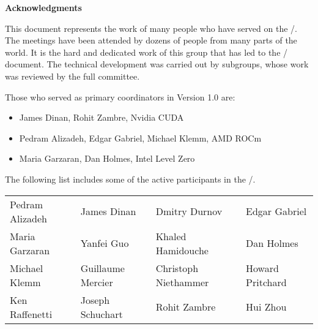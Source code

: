 {\Huge\noindent\textbf{Acknowledgments}}%
{}

\vspace{0.5in}



This document represents the work of many people who have served on
the \MPIHACC/.  The meetings have been attended by dozens of people
from many parts of the world. It is the hard and dedicated work of
this group that has led to the \MEMALLOCDOC/ document. The technical
development was carried out by subgroups, whose work was reviewed by
the full committee.

Those who served as primary coordinators in Version 1.0 are:

\begin{itemize}
\item James Dinan, Rohit Zambre, Nvidia CUDA
\item Pedram Alizadeh, Edgar Gabriel, Michael Klemm, AMD ROCm
\item Maria Garzaran, Dan Holmes, Intel Level Zero
\end{itemize}

The following list includes some of the active participants in
the \MPIHACC/.

\begin{center}
\begin{tabular}{llll}
Pedram Alizadeh &
James Dinan &
Dmitry Durnov &
Edgar Gabriel \\
Maria Garzaran &
Yanfei Guo &
Khaled Hamidouche &
Dan Holmes \\
Michael Klemm &
Guillaume Mercier &
Christoph Niethammer &
Howard Pritchard \\
Ken Raffenetti &
Joseph Schuchart &
Rohit Zambre &
Hui Zhou
\end{tabular}
\end{center}

